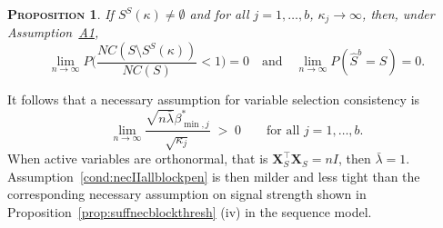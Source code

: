\documentclass[bj,authoryear]{imsart}
\theoremstyle{plain}
\newtheorem{prop}[thm]{\textsc{Proposition}}
\newcommand{\bs}{\boldsymbol}
\begin{document}
\begin{prop}\label{prop:nectypeIIreg}
    If $S^{S}(\kappa)\neq\emptyset$ and for all $j=1,\ldots,b$, $\kappa_j\to \infty$, then, under Assumption~\hyperlink{lab:A1}{A1},
    $$\lim_{n \to \infty} P\Big(\frac{NC(S\setminus S^{S}(\kappa))}{NC(S)}<1\Big)= 0 \quad\text{and}\quad \lim_{n \to \infty} P(\hat{S}^b=S)= 0.$$
\end{prop}
It follows that a necessary assumption for variable selection consistency is
\begin{equation}\label{cond:necIIallblockpen}
\lim_{n\to\infty}\frac{\sqrt{n\bar{\lambda}}\beta_{\min,j}^*}{\sqrt{\kappa_j}}\;>\;0\qquad\mbox{for all }j=1,\ldots,b.
\end{equation}
When active variables are orthonormal, %
that is $\bs X_S^{\top}\bs X_S = nI$, then $\bar{\lambda}=1$. 
Assumption~\eqref{cond:necIIallblockpen} is then milder and less tight than the corresponding necessary assumption on signal strength shown in Proposition~\ref{prop:suffnecblockthresh} (iv)  in the sequence model. 
\end{document}
